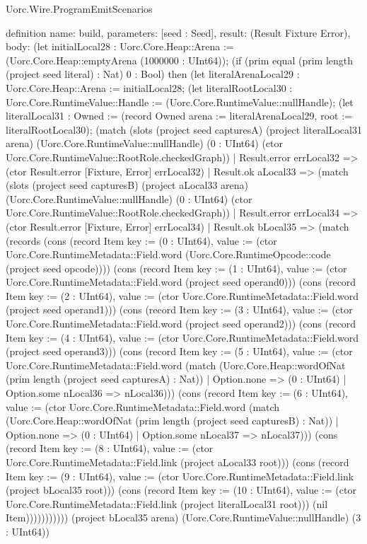 \begin{lexlean}{Uorc.Wire.ProgramEmitScenarios}
\begin{semanticmodule}
definition{
  name: build,
  parameters: [seed : Seed],
  result: (Result Fixture Error),
  body: (let initialLocal28 : Uorc.Core.Heap::Arena := (Uorc.Core.Heap::emptyArena (1000000 : UInt64)); (if (prim equal (prim length (project seed literal) : Nat) 0 : Bool) then (let literalArenaLocal29 : Uorc.Core.Heap::Arena := initialLocal28; (let literalRootLocal30 : Uorc.Core.RuntimeValue::Handle := (Uorc.Core.RuntimeValue::nullHandle); (let literalLocal31 : Owned := (record Owned {arena := literalArenaLocal29, root := literalRootLocal30}); (match (slots (project seed capturesA) (project literalLocal31 arena) (Uorc.Core.RuntimeValue::nullHandle) (0 : UInt64) (ctor Uorc.Core.RuntimeValue::RootRole.checkedGraph))
    | Result.error errLocal32 => (ctor Result.error [Fixture, Error] errLocal32)
    | Result.ok aLocal33 => (match (slots (project seed capturesB) (project aLocal33 arena) (Uorc.Core.RuntimeValue::nullHandle) (0 : UInt64) (ctor Uorc.Core.RuntimeValue::RootRole.checkedGraph))
      | Result.error errLocal34 => (ctor Result.error [Fixture, Error] errLocal34)
      | Result.ok bLocal35 => (match (records (cons (record Item {key := (0 : UInt64), value := (ctor Uorc.Core.RuntimeMetadata::Field.word (Uorc.Core.RuntimeOpcode::code (project seed opcode)))}) (cons (record Item {key := (1 : UInt64), value := (ctor Uorc.Core.RuntimeMetadata::Field.word (project seed operand0))}) (cons (record Item {key := (2 : UInt64), value := (ctor Uorc.Core.RuntimeMetadata::Field.word (project seed operand1))}) (cons (record Item {key := (3 : UInt64), value := (ctor Uorc.Core.RuntimeMetadata::Field.word (project seed operand2))}) (cons (record Item {key := (4 : UInt64), value := (ctor Uorc.Core.RuntimeMetadata::Field.word (project seed operand3))}) (cons (record Item {key := (5 : UInt64), value := (ctor Uorc.Core.RuntimeMetadata::Field.word (match (Uorc.Core.Heap::wordOfNat (prim length (project seed capturesA) : Nat))
          | Option.none => (0 : UInt64)
          | Option.some nLocal36 => nLocal36))}) (cons (record Item {key := (6 : UInt64), value := (ctor Uorc.Core.RuntimeMetadata::Field.word (match (Uorc.Core.Heap::wordOfNat (prim length (project seed capturesB) : Nat))
          | Option.none => (0 : UInt64)
          | Option.some nLocal37 => nLocal37))}) (cons (record Item {key := (8 : UInt64), value := (ctor Uorc.Core.RuntimeMetadata::Field.link (project aLocal33 root))}) (cons (record Item {key := (9 : UInt64), value := (ctor Uorc.Core.RuntimeMetadata::Field.link (project bLocal35 root))}) (cons (record Item {key := (10 : UInt64), value := (ctor Uorc.Core.RuntimeMetadata::Field.link (project literalLocal31 root))}) (nil Item))))))))))) (project bLocal35 arena) (Uorc.Core.RuntimeValue::nullHandle) (3 : UInt64))
}
\end{semanticmodule}
\end{lexlean}
